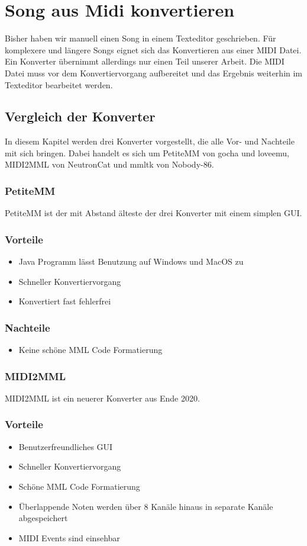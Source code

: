 \section{Song aus Midi konvertieren}

Bisher haben wir manuell einen Song in einem Texteditor geschrieben. Für komplexere und längere Songs eignet sich das Konvertieren aus einer MIDI Datei. Ein Konverter übernimmt allerdings nur einen Teil unserer Arbeit. Die MIDI Datei muss vor dem Konvertiervorgang aufbereitet und das Ergebnis weiterhin im Texteditor bearbeitet werden.
\subsection{Vergleich der Konverter}
In diesem Kapitel werden drei Konverter vorgestellt, die alle Vor- und Nachteile mit sich bringen. Dabei handelt es sich um PetiteMM von gocha und loveemu, MIDI2MML von NeutronCat und mmltk von Nobody-86.
\subsubsection*{PetiteMM}
PetiteMM ist der mit Abstand älteste der drei Konverter mit einem simplen GUI.

\subsubsection*{Vorteile}
\begin{itemize}
	\item Java Programm lässt Benutzung auf Windows und MacOS zu
	\item Schneller Konvertiervorgang
	\item Konvertiert fast fehlerfrei
\end{itemize}

\subsubsection*{Nachteile}
\begin{itemize}
	\item Keine schöne MML Code Formatierung
\end{itemize}

\subsubsection*{MIDI2MML}
MIDI2MML ist ein neuerer Konverter aus Ende 2020.

\subsubsection*{Vorteile}
\begin{itemize}
	\item Benutzerfreundliches GUI
	\item Schneller Konvertiervorgang
	\item Schöne MML Code Formatierung
	\item Überlappende Noten werden über 8 Kanäle hinaus in separate Kanäle abgespeichert
	\item MIDI Events sind einsehbar
\end{itemize}

